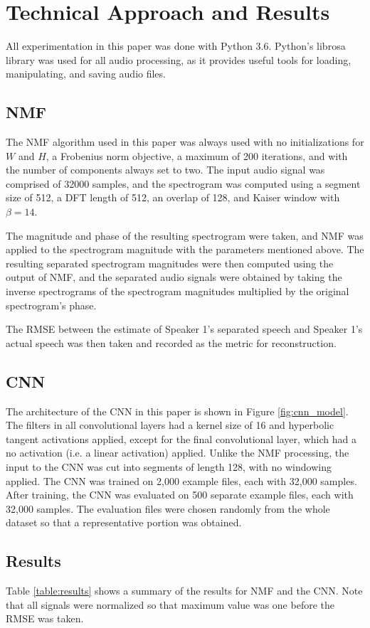 \documentclass[12pt,chapterheads]{ucsd}
\begin{document}
\section{Technical Approach and Results}
All experimentation in this paper was done with Python 3.6. Python's librosa library was used for all audio processing, as it provides useful tools for loading, manipulating, and saving audio files.

\subsection{NMF}
The NMF algorithm used in this paper was always used with no initializations for $W$ and $H$, a Frobenius norm objective, a maximum of 200 iterations, and with the number of components always set to two. The input audio signal was comprised of 32000 samples, and the spectrogram was computed using a segment size of 512, a DFT length of 512, an overlap of 128, and Kaiser window with $\beta = 14$.

The magnitude and phase of the resulting spectrogram were taken, and NMF was applied to the spectrogram magnitude with the parameters mentioned above. The resulting separated spectrogram magnitudes were then computed using the output of NMF, and the separated audio signals were obtained by taking the inverse spectrograms of the spectrogram magnitudes multiplied by the original spectrogram's phase.

The RMSE between the estimate of Speaker 1's separated speech and Speaker 1's actual speech was then taken and recorded as the metric for reconstruction.

\subsection{CNN}
The architecture of the CNN in this paper is shown in Figure \ref{fig:cnn_model}. The filters in all convolutional layers had a kernel size of 16 and hyperbolic tangent activations applied, except for the final convolutional layer, which had a no activation (i.e. a linear activation) applied. Unlike the NMF processing, the input to the CNN was cut into segments of length 128, with no windowing applied. The CNN was trained on 2,000 example files, each with 32,000 samples. After training, the CNN was evaluated on 500 separate example files, each with 32,000 samples. The evaluation files were chosen randomly from the whole dataset so that a representative portion was obtained.


\subsection{Results}
Table \ref{table:results} shows a summary of the results  for NMF and the CNN. Note that all signals were normalized so that maximum value was one before the RMSE was taken.
\end{document}
